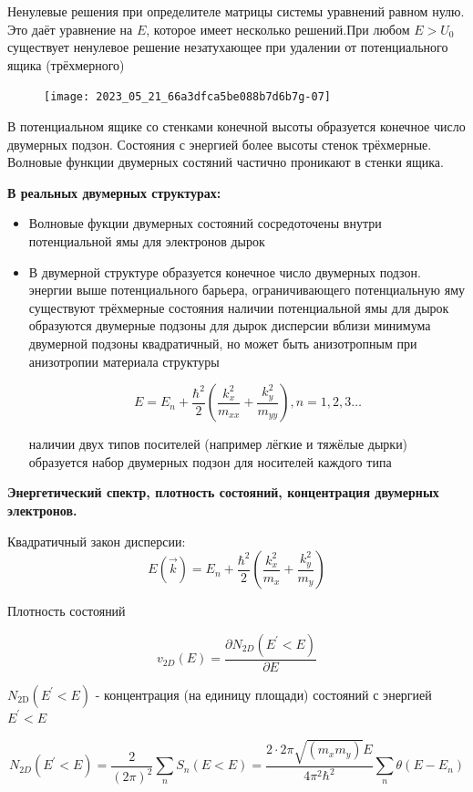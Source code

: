 Ненулевые решения при определителе матрицы системы уравнений равном нулю. Это даёт уравнение на $E$, которое имеет несколько решений.При любом $E>U_{0}$ существует ненулевое решение незатухающее при
 удалении от потенциального ящика (трёхмерного)

 \begin{figure} [h!]
    \centering
    \texttt{[image: 2023\_05\_21\_66a3dfca5be088b7d6b7g-07]}
\end{figure}
 В потенциальном ящике со стенками конечной высоты образуется
конечное число двумерных подзон. Состояния с энергией более
высоты стенок трёхмерные. Волновые функции двумерных состяний
частично проникают в стенки ящика.

\textbf{В реальных двумерных структурах:}
\begin{itemize}
\item Волновые фукции двумерных состояний сосредоточены внутри потенциальной ямы для электронов дырок
\item В двумерной структуре образуется конечное число двумерных подзон.
 энергии выше потенциального барьера, ограничивающего потенциальную яму существуют трёхмерные состояния
 наличии потенциальной ямы для дырок образуются двумерные подзоны для дырок
 дисперсии вблизи минимума двумерной подзоны квадратичный, но может быть анизотропным при анизотропии материала структуры

$$
E=E_{n}+\frac{\hbar^{2}}{2}\left(\frac{k_{x}^{2}}{m_{x x}}+\frac{k_{y}^{2}}{m_{y y}}\right), n=1,2,3 \ldots
$$

 наличии двух типов посителей (например лёгкие и тяжёлые дырки) образуется набор двумерных подзон для носителей каждого типа 

\end{itemize}

\textbf{Энергетический спектр, плотность состояний, концентрация двумерных электронов.}


Квадратичный закон дисперсии:
$$
E(\vec{k})=E_{n}+\frac{\hbar^{2}}{2}\left(\frac{k_{x}^{2}}{m_{x}}+\frac{k_{y}^{2}}{m_{y}}\right)
$$

Плотность состояний

$$
v_{2 D}(E)=\frac{\partial N_{2 D}\left(E^{\prime}<E\right)}{\partial E}
$$

$N_{2 \mathrm{D}}\left(E^{\prime}<E\right)$ - концентрация (на единицу площади) состояний с энергией $E^{\prime}<E$

$$
N_{2 D}\left(E^{\prime}<E\right)=\frac{2}{(2 \pi)^{2}} \sum_{n} S_{n}(E<E)=\frac{2 \cdot 2 \pi \sqrt{\left(m_{x} m_{y}\right)} E}{4 \pi^{2} \hbar^{2}} \sum_{n} \theta\left(E-E_{n}\right)
$$

